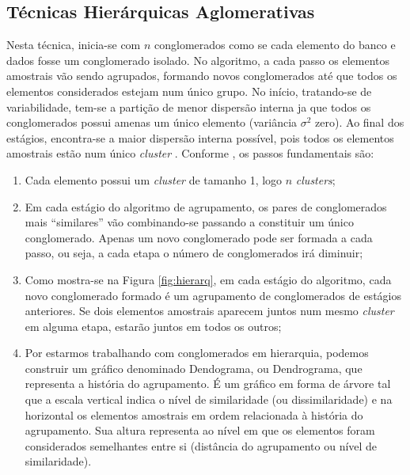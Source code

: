 \documentclass[
  openany]{book}
\begin{document}
\hypertarget{tuxe9cnicas-hieruxe1rquicas-aglomerativas}{%
\subsection{Técnicas Hierárquicas Aglomerativas}\label{tuxe9cnicas-hieruxe1rquicas-aglomerativas}}

Nesta técnica, inicia-se com \(n\) conglomerados como se cada elemento do banco e dados fosse um conglomerado isolado. No algoritmo, a cada passo os elementos amostrais vão sendo agrupados, formando novos conglomerados até que todos os elementos considerados estejam num único grupo. No início, tratando-se de variabilidade, tem-se a partição de menor dispersão interna ja que todos os conglomerados possui amenas um único elemento (variância \(\sigma^2\) zero). Ao final dos estágios, encontra-se a maior dispersão interna possível, pois todos os elementos amostrais estão num único \emph{cluster} \citep{mingoti2007analise}. Conforme \citet{mingoti2007analise}, os passos fundamentais são:

\begin{enumerate}
\def\labelenumi{\arabic{enumi}.}
\item
  Cada elemento possui um \emph{cluster} de tamanho 1, logo \(n\) \emph{clusters};
\item
  Em cada estágio do algoritmo de agrupamento, os pares de conglomerados mais ``similares'' vão combinando-se passando a constituir um único conglomerado. Apenas um novo conglomerado pode ser formada a cada passo, ou seja, a cada etapa o número de conglomerados irá diminuir;
\item
  Como mostra-se na Figura \ref{fig:hierarq}, em cada estágio do algoritmo, cada novo conglomerado formado é um agrupamento de conglomerados de estágios anteriores. Se dois elementos amostrais aparecem juntos num mesmo \emph{cluster} em alguma etapa, estarão juntos em todos os outros;
\item
  Por estarmos trabalhando com conglomerados em hierarquia, podemos construir um gráfico denominado Dendograma, ou Dendrograma, que representa a história do agrupamento. É um gráfico em forma de árvore tal que a escala vertical indica o nível de similaridade (ou dissimilaridade) e na horizontal os elementos amostrais em ordem relacionada à história do agrupamento. Sua altura representa ao nível em que os elementos foram considerados semelhantes entre si (distância do agrupamento ou nível de similaridade).
\end{enumerate}
\end{document}
